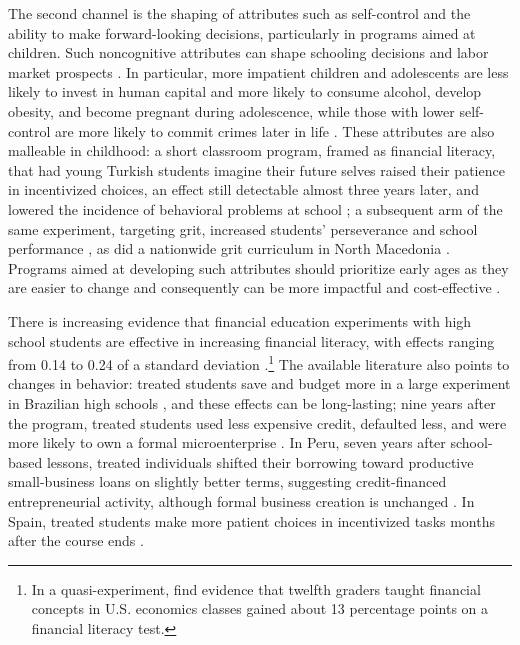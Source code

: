 The second channel is the shaping of attributes such as self-control and the ability to make forward-looking decisions, particularly in programs aimed at children. Such noncognitive attributes can shape schooling decisions and labor market prospects \citep{heckman2006effects, kautz2014fostering, acosta2018role}. In particular, more impatient children and adolescents are less likely to invest in human capital and more likely to consume alcohol, develop obesity, and become pregnant during adolescence, while those with lower self-control are more likely to commit crimes later in life \citep{castillo2011today, sutter2013impatience, golsteyn2014adolescent, moffitt2011gradient}. These attributes are also malleable in childhood: a short classroom program, framed as financial literacy, that had young Turkish students imagine their future selves raised their patience in incentivized choices, an effect still detectable almost three years later, and lowered the incidence of behavioral problems at school \citep{alan2018fostering}; a subsequent arm of the same experiment, targeting grit, increased students' perseverance and school performance \citep{alan2019ever}, as did a nationwide grit curriculum in North Macedonia \citep{santos2021can}. Programs aimed at developing such attributes should prioritize early ages as they are easier to change and consequently can be more impactful and cost-effective \citep{cunha2007technology}.

There is increasing evidence that financial education experiments with high school students are effective in increasing financial literacy, with effects ranging from 0.14 to 0.24 of a standard deviation \citep{bover2026impact, frisancho2023school, Bruhn2016}.\footnote{In a quasi-experiment, \cite{gill2019effects} find evidence that twelfth graders taught financial concepts in U.S. economics classes gained about 13 percentage points on a financial literacy test.} The available literature also points to changes in behavior: treated students save and budget more in a large experiment in Brazilian high schools \citep{Bruhn2016}, and these effects can be long-lasting; nine years after the program, treated students used less expensive credit, defaulted less, and were more likely to own a formal microenterprise \citep{bruhn2025long}. In Peru, seven years after school-based lessons, treated individuals shifted their borrowing toward productive small-business loans on slightly better terms, suggesting credit-financed entrepreneurial activity, although formal business creation is unchanged \citep{frisancho2025lasting}. In Spain, treated students make more patient choices in incentivized tasks months after the course ends \citep{bover2026impact}. 

